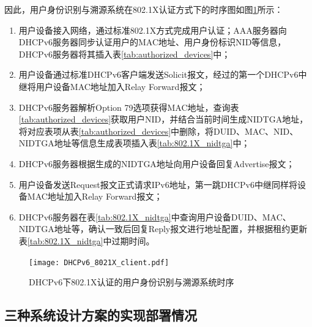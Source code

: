     因此，用户身份识别与溯源系统在802.1X认证方式下的时序图如图\ref{fig:DHCPv6_802.1X_client}所示：
    \begin{enumerate}[1{)}]
      \item 用户设备接入网络，通过标准802.1X方式完成用户认证；AAA服务器向DHCPv6服务器同步认证用户的MAC地址、用户身份标识NID等信息，DHCPv6服务器将其插入表\ref{tab:authorized_devices}中；
      \item 用户设备通过标准DHCPv6客户端发送Solicit报文，经过的第一个DHCPv6中继将用户设备MAC地址加入Relay Forward报文；
      \item DHCPv6服务器解析Option 79选项获得MAC地址，查询表\ref{tab:authorized_devices}获取用户NID，并结合当前时间生成NIDTGA地址，将对应表项从表\ref{tab:authorized_devices}中删除，将DUID、MAC、NID、NIDTGA地址等信息生成表项插入表\ref{tab:802.1X_nidtga}中；
      \item DHCPv6服务器根据生成的NIDTGA地址向用户设备回复Advertise报文；
      \item 用户设备发送Request报文正式请求IPv6地址，第一跳DHCPv6中继同样将设备MAC地址加入Relay Forward报文；
      \item DHCPv6服务器在表\ref{tab:802.1X_nidtga}中查询用户设备DUID、MAC、NIDTGA地址等，确认一致后回复Reply报文进行地址配置，并根据租约更新表\ref{tab:802.1X_nidtga}中过期时间。
    \end{enumerate}
    
    \begin{figure}[ht]
      \centering
      \texttt{[image: DHCPv6\_8021X\_client.pdf]}
      \caption{DHCPv6下802.1X认证的用户身份识别与溯源系统时序}
      \label{fig:DHCPv6_802.1X_client}
    \end{figure}


    \subsection{三种系统设计方案的实现部署情况}
    \label{NIDTGA:DHCPv6:implement}

